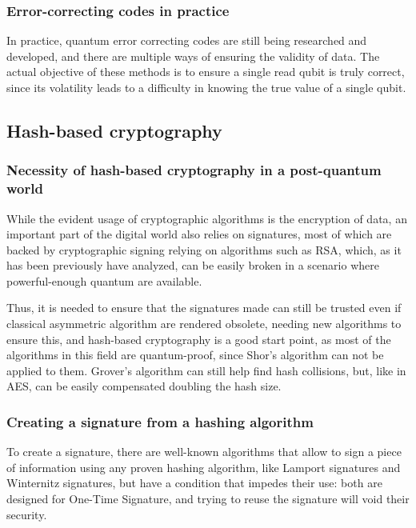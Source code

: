 \subsubsection{Error-correcting codes in practice}

In practice, quantum error correcting codes are still being researched and
developed, and there are multiple ways of ensuring the validity of data. The
actual objective of these methods is to ensure a single read qubit is truly
correct, since its volatility leads to a difficulty in knowing the true value of
a single qubit.

\pagebreak
\subsection{Hash-based cryptography}
\subsubsection{Necessity of hash-based cryptography in a post-quantum world}

While the evident usage of cryptographic algorithms is the encryption of data, an important part of the
digital world also relies on signatures, most of which are backed by cryptographic signing relying on
algorithms such as RSA, which, as it has been previously have analyzed, can be easily broken in a scenario 
where powerful-enough quantum are available.

Thus, it is needed to ensure that the signatures made can still be trusted even if classical asymmetric
algorithm are rendered obsolete, needing new algorithms to ensure this, and hash-based cryptography is a
good start point, as most of the algorithms in this field are quantum-proof, since Shor's algorithm can not
be applied to them. Grover's algorithm can still help find hash collisions, but, like in AES, can be easily
compensated doubling the hash size.

\subsubsection{Creating a signature from a hashing algorithm}

To create a signature, there are well-known algorithms that allow to sign a piece of information using any
proven hashing algorithm, like Lamport signatures and Winternitz signatures, but have a condition that
impedes their use: both are designed for One-Time Signature, and trying to reuse the signature will
void their security.

